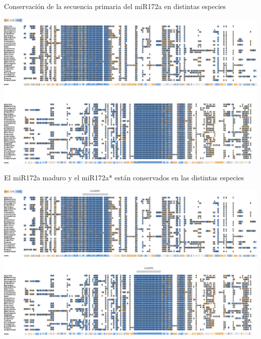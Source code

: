 \documentclass{beamer}
\begin{document}
    
    


\begin{frame}{Conservación de la secuencia primaria del miR172a en distintas especies}
	\begin{center}
		\includegraphics[width=1\textwidth]{img/miR172a_tcoffee_01.png}
	\end{center}
\end{frame}

\begin{frame}{El miR172a maduro y el miR172a* están conservados en las distintas especies}
	\begin{center}
		\includegraphics[width=1\textwidth]{img/miR172a_tcoffee_02.png}
	\end{center}
\end{frame}
\end{document}
